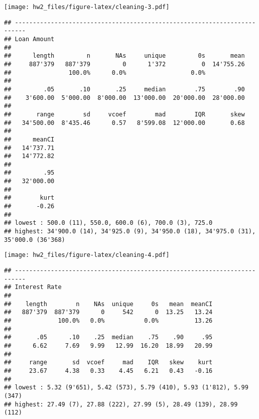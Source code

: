 \documentclass[]{article}
\newenvironment{Shaded}{\begin{snugshade}}{\end{snugshade}}
\newcommand{\KeywordTok}[1]{\textcolor[rgb]{0.13,0.29,0.53}{\textbf{#1}}}
\newcommand{\DataTypeTok}[1]{\textcolor[rgb]{0.13,0.29,0.53}{#1}}
\newcommand{\StringTok}[1]{\textcolor[rgb]{0.31,0.60,0.02}{#1}}
\newcommand{\OtherTok}[1]{\textcolor[rgb]{0.56,0.35,0.01}{#1}}
\newcommand{\OperatorTok}[1]{\textcolor[rgb]{0.81,0.36,0.00}{\textbf{#1}}}
\newcommand{\NormalTok}[1]{#1}
\begin{document}
\texttt{[image: hw2\_files/figure-latex/cleaning-3.pdf]}

\begin{Shaded}
\end{Shaded}

\begin{verbatim}
## ------------------------------------------------------------------------- 
## Loan Amount
## 
##      length         n       NAs     unique         0s       mean
##     887'379   887'379         0      1'372          0  14'755.26
##                100.0%      0.0%                  0.0%           
##                                                                 
##         .05       .10       .25     median        .75        .90
##    3'600.00  5'000.00  8'000.00  13'000.00  20'000.00  28'000.00
##                                                                 
##       range        sd     vcoef        mad        IQR       skew
##   34'500.00  8'435.46      0.57   8'599.08  12'000.00       0.68
##                                                                 
##      meanCI
##   14'737.71
##   14'772.82
##            
##         .95
##   32'000.00
##            
##        kurt
##       -0.26
##            
## lowest : 500.0 (11), 550.0, 600.0 (6), 700.0 (3), 725.0
## highest: 34'900.0 (14), 34'925.0 (9), 34'950.0 (18), 34'975.0 (31), 35'000.0 (36'368)
\end{verbatim}

\texttt{[image: hw2\_files/figure-latex/cleaning-4.pdf]}

\begin{Shaded}
\end{Shaded}

\begin{verbatim}
## ------------------------------------------------------------------------- 
## Interest Rate
## 
##    length        n    NAs  unique     0s   mean  meanCI
##   887'379  887'379      0     542      0  13.25   13.24
##             100.0%   0.0%           0.0%          13.26
##                                                        
##       .05      .10    .25  median    .75    .90     .95
##      6.62     7.69   9.99   12.99  16.20  18.99   20.99
##                                                        
##     range       sd  vcoef     mad    IQR   skew    kurt
##     23.67     4.38   0.33    4.45   6.21   0.43   -0.16
##                                                        
## lowest : 5.32 (9'651), 5.42 (573), 5.79 (410), 5.93 (1'812), 5.99 (347)
## highest: 27.49 (7), 27.88 (222), 27.99 (5), 28.49 (139), 28.99 (112)
\end{verbatim}
\end{document}
